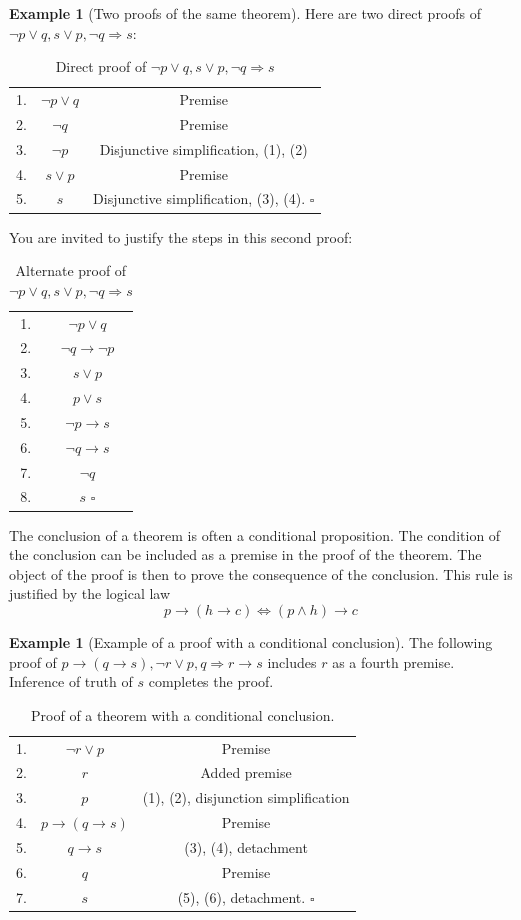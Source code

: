 \documentclass[10pt,]{book}
\theoremstyle{plain}
\theoremstyle{definition}
\theoremstyle{definition}
\theoremstyle{definition}
\newtheorem{example}[theorem]{Example}
\theoremstyle{definition}
\begin{document}
%
\begin{example}[Two proofs of the same theorem]\label{proof-3-5-2}
 Here are two direct proofs of \(\neg p \lor  q, s\lor  p, \neg q \Rightarrow  s\):%
\leavevmode%
\begin{table}
\centering
\begin{tabular}{ccc}
1.&\(\neg p \lor  q\)&Premise\tabularnewline[0pt]
2.&\(\neg q\)&Premise\tabularnewline[0pt]
3.&\(\neg p\)&Disjunctive simplification, (1), (2)\tabularnewline[0pt]
4.&\(s\lor  p\)&Premise\tabularnewline[0pt]
5.&\(s\)&Disjunctive simplification, (3), (4). \(\square\)
\end{tabular}
\caption{Direct proof of  \(\neg p \lor  q, s\lor  p, \neg q \Rightarrow  s\)\label{proof-steps-2}}
\end{table}
\par
You are invited to justify the steps in this second proof:%
\leavevmode%
\begin{table}
\centering
\begin{tabular}{cc}
1.&\(\neg p \lor  q\)\tabularnewline[0pt]
2.&\(\neg q \rightarrow  \neg p\)\tabularnewline[0pt]
3.&\(s\lor p\)\tabularnewline[0pt]
4.&\(p \lor  s\)\tabularnewline[0pt]
5.&\(\neg p \to s\)\tabularnewline[0pt]
6.&\(\neg q \rightarrow  s\)\tabularnewline[0pt]
7.&\(\neg q\)\tabularnewline[0pt]
8.&\(s\)    \(\square\)
\end{tabular}
\caption{Alternate  proof of  \(\neg p \lor  q, s\lor  p, \neg q \Rightarrow  s\)\label{proof-steps-2a}}
\end{table}
\end{example}
\par
The conclusion of a theorem is often a conditional proposition. The condition of the conclusion can be included as a premise in the proof of the theorem. The object of the proof is then to prove the consequence of the conclusion. This rule is justified by the logical law
\begin{equation*}p \rightarrow  (h \rightarrow  c) \Leftrightarrow  (p \land  h) \rightarrow  c\end{equation*}
%
\begin{example}[Example of a proof with a conditional conclusion]\label{ex-conditinal-conclusion}
The following proof of \(p \to  (q \rightarrow  s), \neg r  \lor p, q \Rightarrow r \rightarrow s\) includes
\(r\) as a fourth premise. Inference of truth of \(s\) completes the proof.%
\leavevmode%
\begin{table}
\centering
\begin{tabular}{ccc}
1.&\(\neg r \lor p\)&  Premise\tabularnewline[0pt]
2.&\(r\)&  Added premise\tabularnewline[0pt]
3.&\(p\)&  (1), (2), disjunction simplification\tabularnewline[0pt]
4.&\(p \rightarrow  (q \to s)\)& Premise\tabularnewline[0pt]
5.&\(q\rightarrow s\)&  (3), (4), detachment\tabularnewline[0pt]
6.&\(q\)&  Premise\tabularnewline[0pt]
7.&\(s\)&   (5), (6), detachment. \(\square\) 
\end{tabular}
\caption{Proof of a theorem with a conditional conclusion.\label{proof-conditional-conclusion}}
\end{table}
\end{example}
\end{document}
